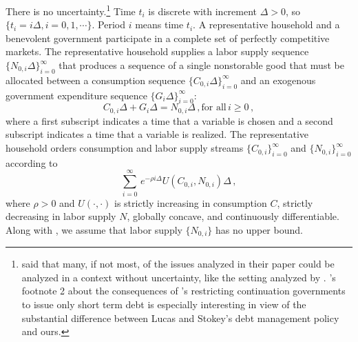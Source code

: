 \documentclass[12pt]{article}
\newcommand{\NW}[1]{{\textcolor{blue}{#1}}}
\begin{document}
There is no uncertainty.\footnote{\citet[ftnt.~1]{LucasStokey1983}  said that many, if not most, of the issues analyzed in their paper could be analyzed in a context without uncertainty,
like the setting analyzed by \citet{turnovsky1980time}.  \citeauthor{LucasStokey1983}'s footnote 2 about  the consequences of  \citeauthor{turnovsky1980time}'s restricting continuation governments to issue only short term debt is especially interesting in view of the substantial difference between Lucas and Stokey's debt management policy and ours.} Time  $t_i$ is discrete with increment $\Delta >0$, so $\{ t_i=i\Delta, i=0, 1, \cdots\}$.  Period  $i$  means time $t_i.$ A representative household and a benevolent government participate in a complete set of perfectly competitive markets. 
The representative household supplies a labor supply sequence $\{N_{0, i}{\Delta}\}_{i=0}^\infty$ that produces a sequence  of a single nonstorable good that must be  allocated between  a consumption sequence  $\{C_{0, i}{\Delta}\}_{i=0}^\infty$ and an exogenous  government expenditure sequence $\{G_{i}{\Delta}\}_{i=0}^\infty$:
\begin{equation}\label{resource_constraint}
	C_{0, i}\Delta + G_{i}\Delta = N_{0, i}\Delta\,, \text{for all}\,  i\geq 0\,,
\end{equation}
{where a first subscript indicates a  time  that a variable is chosen and a second subscript indicates a time  that a variable is realized.} %
The representative household orders consumption and labor supply streams $\{C_{0, i}\}_{i=0}^\infty$ and $\{N_{0, i}\}_{i=0}^\infty$ according to
\begin{equation} \label{utility}
	\sum_{i=0}^\infty \, e^{-\rho i\Delta} U(C_{0, i}, N_{0, i})\Delta\,,
\end{equation}
where $\rho>0$ and $U(\cdot,\cdot)$ is strictly increasing in consumption $C$, strictly decreasing in labor supply $N$, globally concave, and continuously differentiable. Along with \cite{debortoli2021optimal}, we assume that labor supply $\{N_{0, i}\}$ has no upper bound.
\end{document}
